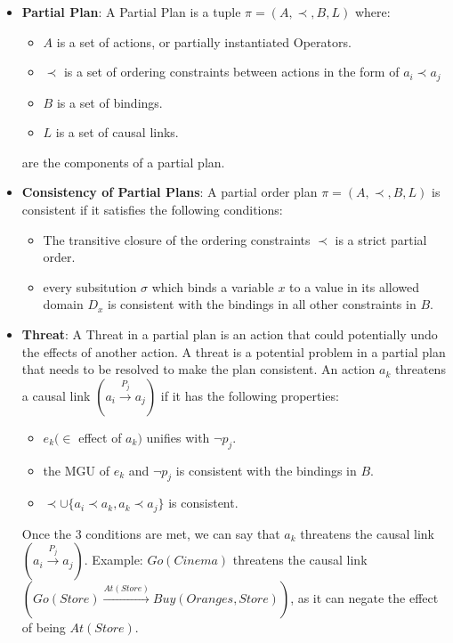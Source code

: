 \begin{itemize}
      \item  \label{def:partial_plan}
            \textbf{Partial Plan}: A Partial Plan is a tuple $\pi = (A, \prec, B, L)$ where:
            \begin{itemize}
                  \item $A$ is a set of actions, or partially instantiated Operators.
                  \item $\prec$ is a set of ordering constraints between actions in the form of $a_i \prec a_j$
                  \item $B$ is a set of bindings.
                  \item $L$ is a set of causal links.
            \end{itemize}
            are the components of a partial plan.


      \item  \label{def:consistency_partial_plan}
            \textbf{Consistency of Partial Plans}: A partial order plan $\pi = (A, \prec, B, L)$ is consistent if it satisfies the following conditions: \cite{10.5555/975615}
            \begin{itemize}
                  \item The transitive closure of the ordering constraints $\prec$ is a strict partial order.
                  \item every subsitution $\sigma $ which binds a variable $x$ to a value in its allowed domain $D_x$ is consistent with the bindings in all other constraints in $B$.
            \end{itemize}


      \item  \label{def:threat}
            \textbf{Threat}: A Threat in a partial plan is an action that could potentially undo the effects of another action. A threat is a potential problem in a partial plan that needs to be resolved to make the plan consistent. An action $a_k$ threatens a causal link $(a_i \xrightarrow{\text{$P_j$}}  a_j)$ if it has the following properties:
            \begin{itemize}
                  \item $e_k (\in$ effect of $a_k)$ unifies with $\lnot p_j$.
                  \item the \ac{MGU} of $e_k$ and $\lnot p_j$ is consistent with the bindings in $B$.
                  \item $\prec \cup \{a_i \prec a_k, a_k \prec a_j\}$ is consistent.
            \end{itemize}
            Once the 3 conditions are met, we can say that $a_k$ threatens the causal link $(a_i \xrightarrow{\text{$P_j$}}  a_j)$.
            Example: $Go(Cinema)$ threatens the causal link $(Go(Store) \xrightarrow{\text{$At(Store)$}} Buy(Oranges,Store))$, as it can negate the effect of being $At(Store)$.


\end{itemize}
